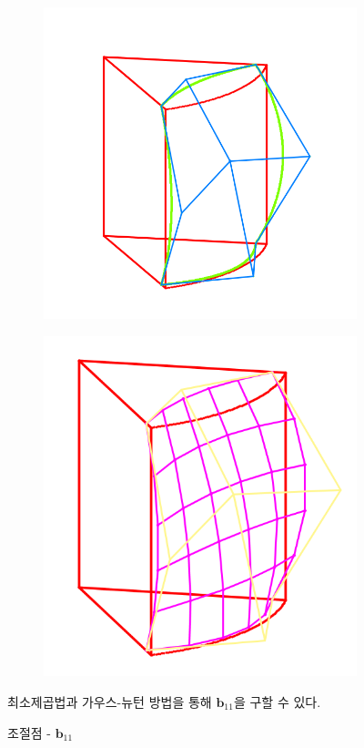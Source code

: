 \documentclass{gshs_thesis}
\theoremstyle{theorem}
\theoremstyle{lemma}
\theoremstyle{definition}
\begin{document}
\begin{figure}[h]
	\begin{center}
		\begin{subfigure}{.2\textwidth}
			\includegraphics[width=\textwidth]{image/approx3}
		\end{subfigure}
		\begin{subfigure}{.2\textwidth}
			\includegraphics[width=\textwidth]{image/approx4}
		\end{subfigure}
	\end{center} 
	\caption{조절점 - $\mathbf{b}_{11}$}
	\raggedright \small  최소제곱법과 가우스-뉴턴 방법을 통해 $\mathbf{b}_{11}$을 구할 수 있다. 
\end{figure}
\end{document}
